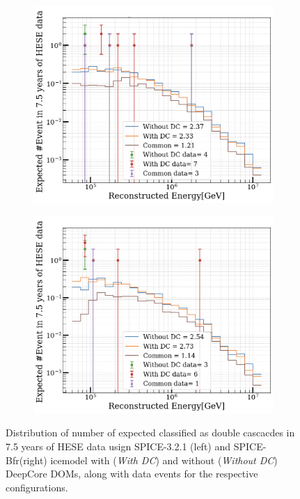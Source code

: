 \begin{figure}
    \begin{subfigure}[h]{0.7\textwidth}
        \includegraphics{./figures/results/Spice_DCwithdata.png}
    \end{subfigure}
    \hfill
    \begin{subfigure}[h]{0.7\textwidth}
        \includegraphics{./figures/results/Bfr_DCwithdata.png}
       
    \end{subfigure}%
    \caption{Distribution of number of expected classified as double cascacdes in 7.5 years of HESE data usign SPICE-3.2.1 (left) and SPICE-Bfr(right) icemodel with (\emph{With DC}) and without (\emph{Without DC}) DeepCore DOMs, along with data events for the respective configurations.}
\end{figure}

